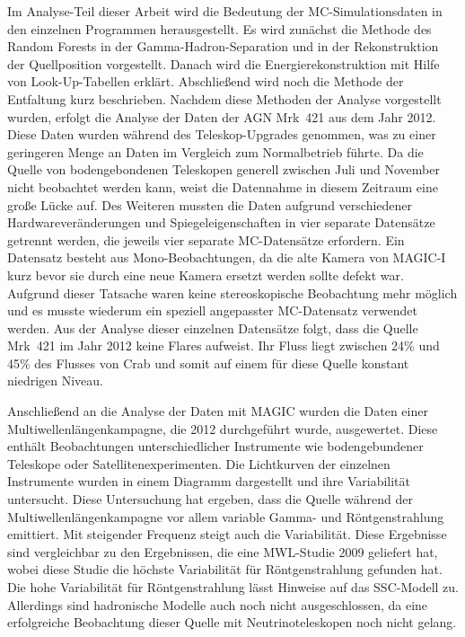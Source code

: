 Im Analyse-Teil dieser Arbeit wird die Bedeutung der MC-Simulationsdaten in den einzelnen Programmen herausgestellt.
Es wird zunächst die Methode des Random Forests in der Gamma-Hadron-Separation und in der Rekonstruktion der Quellposition vorgestellt.
Danach wird die Energierekonstruktion mit Hilfe von Look-Up-Tabellen erklärt.
Abschließend wird noch die Methode der Entfaltung kurz beschrieben.
Nachdem diese Methoden der Analyse vorgestellt wurden, erfolgt die Analyse der Daten der AGN Mrk~421 aus dem Jahr 2012.
Diese Daten wurden während des Teleskop-Upgrades genommen, was zu einer geringeren Menge an Daten im Vergleich zum Normalbetrieb führte.
Da die Quelle von bodengebondenen Teleskopen generell zwischen Juli und November nicht beobachtet werden kann, weist die Datennahme in diesem Zeitraum eine große Lücke auf. 
Des Weiteren mussten die Daten aufgrund verschiedener Hardwareveränderungen und Spiegeleigenschaften in vier separate Datensätze getrennt werden, die jeweils vier separate MC-Datensätze erfordern.
Ein Datensatz besteht aus Mono-Beobachtungen, da die alte Kamera von MAGIC-I kurz bevor sie durch eine neue Kamera ersetzt werden sollte defekt war.
Aufgrund dieser Tatsache waren keine stereoskopische Beobachtung mehr möglich und es musste wiederum ein speziell angepasster MC-Datensatz verwendet werden.
Aus der Analyse dieser einzelnen Datensätze folgt, dass die Quelle Mrk~421 im Jahr 2012 keine Flares aufweist.
Ihr Fluss liegt zwischen 24\% und 45\% des Flusses von Crab und somit auf einem für diese Quelle konstant niedrigen Niveau.

Anschließend an die Analyse der Daten mit MAGIC wurden die Daten einer Multiwellenlängenkampagne, die 2012 durchgeführt wurde, ausgewertet.
Diese enthält Beobachtungen unterschiedlicher Instrumente wie bodengebundener Teleskope oder Satellitenexperimenten.
Die Lichtkurven der einzelnen Instrumente wurden in einem Diagramm dargestellt und ihre Variabilität untersucht.
Diese Untersuchung hat ergeben, dass die Quelle während der Multiwellenlängenkampagne vor allem variable Gamma- und Röntgenstrahlung emittiert.
Mit steigender Frequenz steigt auch die Variabilität.
Diese Ergebnisse sind vergleichbar zu den Ergebnissen, die eine MWL-Studie 2009 geliefert hat, wobei diese Studie die höchste Variabilität für Röntgenstrahlung gefunden hat.
Die hohe Variabilität für Röntgenstrahlung lässt Hinweise auf das SSC-Modell zu.
Allerdings sind hadronische Modelle auch noch nicht ausgeschlossen, da eine erfolgreiche Beobachtung dieser Quelle mit Neutrinoteleskopen noch nicht gelang.

